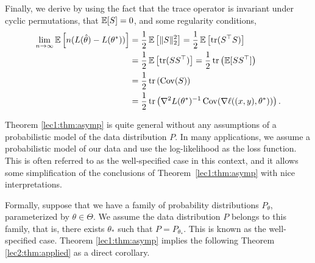 Finally, we derive  by using the fact that the trace operator is invariant under cyclic permutations,  that $\operatorname*{\mathbb{E}} [S] = 0$, and some regularity conditions,
\begin{align}
    \lim_{n \to \infty} \operatorname*{\mathbb{E}} \left[ n (L(\hat \theta) - L(\theta^*)) \right] &= \frac12 \operatorname*{\mathbb{E}}\left[ \|S\|_2^2 \right] = \frac12 \operatorname*{\mathbb{E}} \left[ \operatorname{tr}(S^\top S) \right] \\
    &= \frac12 \operatorname*{\mathbb{E}} \left[ \operatorname{tr}(S S^\top) \right]  = \frac12 \operatorname{tr} \left(\operatorname*{\mathbb{E}}[S S^\top] \right) \\
    &= \frac12 \operatorname{tr} \left( \operatorname{Cov}(S) \right) \\
    &= \frac12 \operatorname{tr}\left( \nabla^2 L(\theta^*)^{-1} \operatorname{Cov}(\nabla \ell ((x, y), \theta^*)) \right).
\end{align}


Theorem \ref{lec1:thm:asymp} is quite general without any assumptions of a probabilistic model of the data distribution $P$. In many applications, we assume a probabilistic model of our data and use the log-likelihood as the loss function. This is often referred to as the well-specified case in this context, and it allows some simplification of the conclusions of Theorem~\ref{lec1:thm:asymp} with nice interpretations. 


Formally, suppose that we have a family of probability distributions $P_\theta$, parameterized by $\theta \in \Theta$. We assume the data distribution $P$ belongs to this family, that is, there exists $\theta_*$ such that $P = P_{\theta_*}$. This is known as the well-specified case. Theorem \ref{lec1:thm:asymp} implies the following Theorem \ref{lec2:thm:applied} as a direct corollary.

